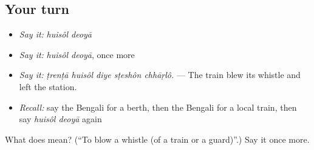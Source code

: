 \subsection*{Your turn}
\begin{itemize}
\raggedright
  \item \emph{Say it:} \emph{huisôl deoyā}
  \item \emph{Say it:} \emph{huisôl deoyā}, once more
  \item \emph{Say it:} \emph{ṭrenṭā huisôl diye sṭeshôn chhāṛlô.} — The train blew its whistle and left the station.
  \item \emph{Recall:} say the Bengali for a berth, then the Bengali for a local train, then say \emph{huisôl deoyā} again
\end{itemize}

\begin{tcolorbox}[breakable,colback=teal!4,colframe=teal!35!black,title={Before you move on}]
What does   mean? (\textquotedblleft{}To blow a whistle (of a train or a guard)\textquotedblright{}.) Say it once more.
\end{tcolorbox}
